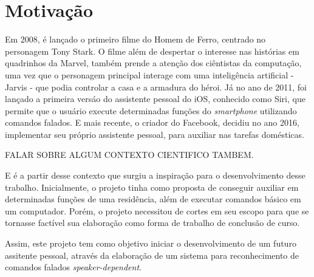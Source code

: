 \documentclass[a4paper,12pt,twoside,openright]{report}
\begin{document}
\section{Motiva\c{c}\~{a}o}
\par Em 2008, \'{e} lan{\c c}ado o primeiro filme do Homem de Ferro, centrado no personagem Tony Stark. O filme al\'{e}m de despertar o interesse nas hist\'{o}rias em quadrinhos da Marvel, tamb\'{e}m prende a aten{\c c}\~{a}o dos ci\^{e}ntistas da computa{\c c}\~{a}o, uma vez que o personagem principal interage com uma intelig\^{e}ncia artificial - Jarvis - que podia controlar a casa e a armadura do h\'{e}roi. J\'{a} no ano de 2011, foi lan{\c c}ado a primeira vers\'{a}o do assistente pessoal do iOS, conhecido como Siri, que permite que o usu\'{a}rio execute determinadas fun{\c c}\~{o}es do \textit{smartphone} utilizando comandos falados. E mais recente, o criador do Facebook, decidiu no ano 2016, implementar seu pr\'{o}prio assistente pessoal, para auxiliar nas tarefas dom\'{e}sticas.
\par FALAR SOBRE ALGUM CONTEXTO CIENTIFICO TAMBEM.
\par E \'{e} a partir desse contexto que surgiu a inspira{\c c}\~{a}o para o desenvolvimento desse trabalho. Inicialmente, o projeto tinha como proposta de conseguir auxiliar em determinadas fun{\c c}\~{o}es de uma resid\^{e}ncia, al\'{e}m de executar comandos b\'{a}sico em um computador. Por\'{e}m, o projeto necessitou de cortes em seu escopo para que se tornasse fact\'{i}vel sua elabora{\c c}\~{a}o como forma de trabalho de conclus\~{a}o de curso.
\par Assim, este projeto tem como objetivo iniciar o desenvolvimento de um futuro assitente pessoal, atrav\'{e}s da elabora{\c c}\~{a}o de um sistema para reconhecimento de comandos falados \textit{speaker-dependent}. 

\end{document}
